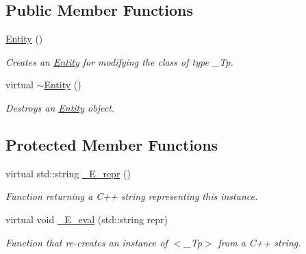 \subsection*{Public Member Functions}
\begin{DoxyCompactItemize}
\item 
\hyperlink{classsheila_1_1Entity_acd3c33a7c16f043198dc08980cc3e3a0}{Entity} ()
\begin{DoxyCompactList}\small\item\em Creates an {\ttfamily \hyperlink{classsheila_1_1Entity}{Entity}} for modifying the class of type {\itshape \+\_\+\+Tp}. \end{DoxyCompactList}\item 
virtual \hyperlink{classsheila_1_1Entity_ab658bb0db6c8dd6c35266f1416e55be1}{$\sim$\+Entity} ()
\begin{DoxyCompactList}\small\item\em Destroys an {\ttfamily \hyperlink{classsheila_1_1Entity}{Entity}} object. \end{DoxyCompactList}\end{DoxyCompactItemize}
\subsection*{Protected Member Functions}
\begin{DoxyCompactItemize}
\item 
virtual std\+::string \hyperlink{classsheila_1_1Entity_ae03819cad9837cc6620e345f4de4fb50}{\+\_\+\+E\+\_\+repr} ()
\begin{DoxyCompactList}\small\item\em Function returning a C++ string representing this instance. \end{DoxyCompactList}\item 
virtual void \hyperlink{classsheila_1_1Entity_aa19bb3e89281908d2a8c0ecc3b99005a}{\+\_\+\+E\+\_\+eval} (std\+::string repr)
\begin{DoxyCompactList}\small\item\em Function that re-\/creates an instance of $<$\+\_\+\+Tp$>$ from a C++ string. \end{DoxyCompactList}\end{DoxyCompactItemize}
